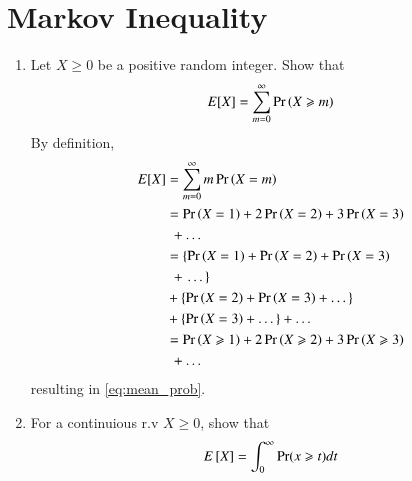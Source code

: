 \documentclass[journal,12pt,twocolumn]{IEEEtran}
\renewcommand\thesection{\arabic{section}}
\begin{document}
\section{Markov Inequality}
\begin{enumerate}[label=\thesection.\arabic*,ref=\thesection.\theenumi]
\item Let $X \ge 0$ be a positive random integer. Show that
\begin{align}
E[X]=\sum_{m=0}^{\infty} \Pr\left(X\geqslant m\right)
\end{align}
\solution By definition,
\begin{align}
\label{eq:mean_prob}
E[X]&=\sum_{m=0}^{\infty} m\Pr\left(X = m\right)
\\
&= \Pr\left(X = 1\right)+2\Pr\left(X = 2\right)+3\Pr\left(X = 3\right)
\nonumber\\
&\,\,+\dots
\\
&= \left\{\Pr\left(X = 1\right)+\Pr\left(X = 2\right)+\Pr\left(X = 3\right)\right.
\nonumber \\
&\,\,+\left.\dots\right\}
\\
&+ \left\{\Pr\left(X = 2\right)+\Pr\left(X = 3\right)+\dots\right\}
\\
&+ \left\{\Pr\left(X = 3\right)+\dots\right\} + \dots
\\
&= \Pr\left(X \geqslant 1\right)+2\Pr\left(X \geqslant 2\right)+3\Pr\left(X \geqslant 3\right)
\nonumber\\
&\,\,+\dots
\end{align}
resulting in \eqref{eq:mean_prob}.
\item For a continuious r.v $X \ge 0$, show that 
\begin{align}
E{}\left[X\right]=\int_{0}^{\infty} \Pr(x\geqslant t)dt
\end{align}


\end{enumerate}
\end{document}

